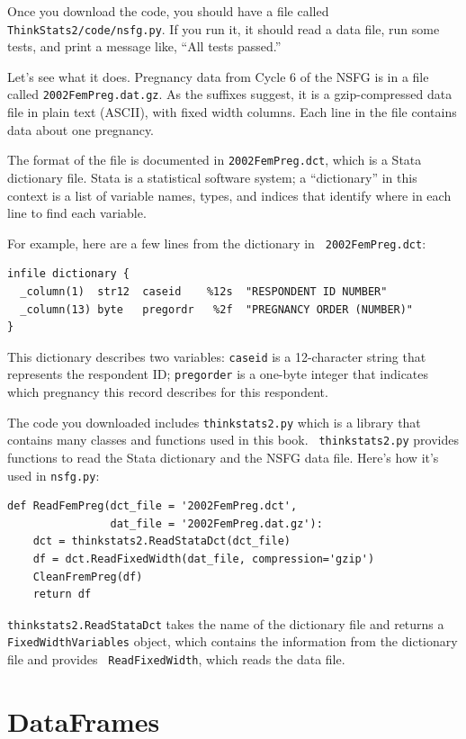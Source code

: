 \documentclass[12pt]{book}
\begin{document}
Once you download the code, you should
have a file called {\tt ThinkStats2/code/nsfg.py}.  If you run it,
it should read a data file, run some tests, and print a message
like, ``All tests passed.''

Let's see what it does.  Pregnancy data from Cycle 6 of the NSFG is in
a file called {\tt 2002FemPreg.dat.gz}.  As the suffixes suggest, it
is a gzip-compressed data file in plain text (ASCII), with fixed width
columns.  Each line in the file contains data about one pregnancy.

The format of the file is documented in {\tt 2002FemPreg.dct}, which
is a Stata dictionary file.  Stata is a statistical software system;
a ``dictionary'' in this context is a list of variable names, types,
and indices that identify where in each line to find each variable.

For example, here are a few lines from the dictionary in {\tt
  2002FemPreg.dct}:
%
\begin{verbatim}
infile dictionary {
  _column(1)  str12  caseid    %12s  "RESPONDENT ID NUMBER"
  _column(13) byte   pregordr   %2f  "PREGNANCY ORDER (NUMBER)"
}
\end{verbatim}

This dictionary describes two variables: {\tt caseid} is a 12-character
string that represents the respondent ID; {\tt pregorder} is a 
one-byte integer that indicates which pregnancy this record
describes for this respondent.

The code you downloaded includes {\tt thinkstats2.py} which is a library
that contains many classes and functions used in this book.  {\tt
  thinkstats2.py} provides functions to read the Stata dictionary and
the NSFG data file.  Here's how it's used in {\tt nsfg.py}:

\begin{verbatim}
def ReadFemPreg(dct_file = '2002FemPreg.dct',
                dat_file = '2002FemPreg.dat.gz'):
    dct = thinkstats2.ReadStataDct(dct_file)
    df = dct.ReadFixedWidth(dat_file, compression='gzip')
    CleanFremPreg(df)
    return df
\end{verbatim}

{\tt thinkstats2.ReadStataDct} takes the name of the dictionary file
and returns a {\tt FixedWidthVariables} object, which contains the
information from the dictionary file and provides {\tt
  ReadFixedWidth}, which reads the data file.


\section{DataFrames}
\end{document}

